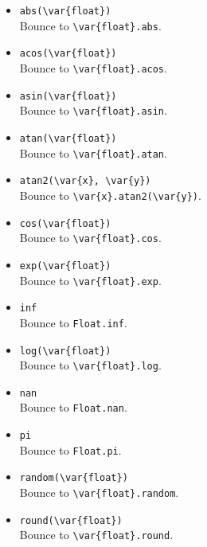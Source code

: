 \begin{itemize}
\item \lstinline|abs(\var{float})|\\
  Bounce to \lstinline|\var{float}.abs|.

\item \lstinline|acos(\var{float})|\\
  Bounce to \lstinline|\var{float}.acos|.

\item \lstinline|asin(\var{float})|\\
  Bounce to \lstinline|\var{float}.asin|.

\item \lstinline|atan(\var{float})|\\
  Bounce to \lstinline|\var{float}.atan|.

\item \lstinline|atan2(\var{x}, \var{y})|\\
  Bounce to \lstinline|\var{x}.atan2(\var{y})|.

\item \lstinline|cos(\var{float})|\\
  Bounce to \lstinline|\var{float}.cos|.

\item \lstinline|exp(\var{float})|\\
  Bounce to \lstinline|\var{float}.exp|.

\item \lstinline|inf|\\
  Bounce to \lstinline|Float.inf|.

\item \lstinline|log(\var{float})|\\
  Bounce to \lstinline|\var{float}.log|.

\item \lstinline|nan|\\
  Bounce to \lstinline|Float.nan|.

\item \lstinline|pi|\\
  Bounce to \lstinline|Float.pi|.

\item \lstinline|random(\var{float})|\\
  Bounce to \lstinline|\var{float}.random|.

\item \lstinline|round(\var{float})|\\
  Bounce to \lstinline|\var{float}.round|.


\end{itemize}
